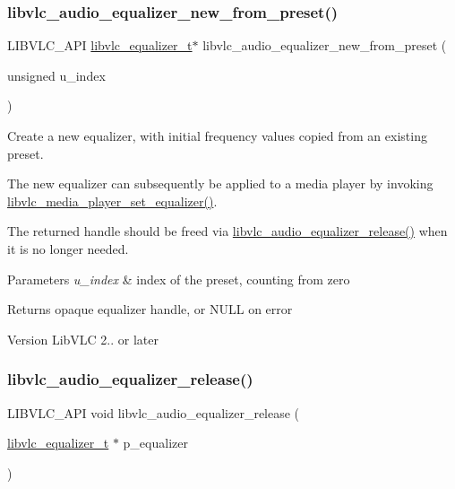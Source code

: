 \subsubsection{\texorpdfstring{libvlc\+\_\+audio\+\_\+equalizer\+\_\+new\+\_\+from\+\_\+preset()}{libvlc\_audio\_equalizer\_new\_from\_preset()}}
{\footnotesize\ttfamily L\+I\+B\+V\+L\+C\+\_\+\+A\+PI \hyperlink{group__libvlc__media__player_ga1ea141a84d68d0147fc58d99bfc83ab7}{libvlc\+\_\+equalizer\+\_\+t}$\ast$ libvlc\+\_\+audio\+\_\+equalizer\+\_\+new\+\_\+from\+\_\+preset (\begin{DoxyParamCaption}\item[{unsigned}]{u\+\_\+index }\end{DoxyParamCaption})}

Create a new equalizer, with initial frequency values copied from an existing preset.

The new equalizer can subsequently be applied to a media player by invoking \hyperlink{group__libvlc__audio_ga0d355443d391d0bc2dafe9b6963a8f53}{libvlc\+\_\+media\+\_\+player\+\_\+set\+\_\+equalizer()}.

The returned handle should be freed via \hyperlink{group__libvlc__audio_gae574f86a29c7dbe9eeb1f3d397262e55}{libvlc\+\_\+audio\+\_\+equalizer\+\_\+release()} when it is no longer needed.


\begin{DoxyParams}{Parameters}
{\em u\+\_\+index} & index of the preset, counting from zero \\
\hline
\end{DoxyParams}
\begin{DoxyReturn}{Returns}
opaque equalizer handle, or N\+U\+LL on error 
\end{DoxyReturn}
\begin{DoxyVersion}{Version}
Lib\+V\+LC 2.. or later 
\end{DoxyVersion}
\mbox{\label{group__libvlc__audio_gae574f86a29c7dbe9eeb1f3d397262e55}} 
\subsubsection{\texorpdfstring{libvlc\+\_\+audio\+\_\+equalizer\+\_\+release()}{libvlc\_audio\_equalizer\_release()}}
{\footnotesize\ttfamily L\+I\+B\+V\+L\+C\+\_\+\+A\+PI void libvlc\+\_\+audio\+\_\+equalizer\+\_\+release (\begin{DoxyParamCaption}\item[{\hyperlink{group__libvlc__media__player_ga1ea141a84d68d0147fc58d99bfc83ab7}{libvlc\+\_\+equalizer\+\_\+t} $\ast$}]{p\+\_\+equalizer }\end{DoxyParamCaption})}

